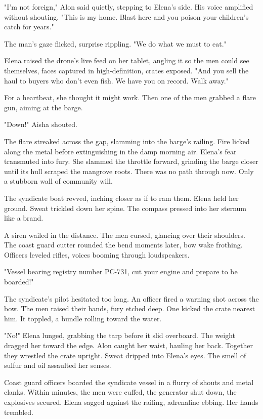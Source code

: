 "I'm not foreign," Alon said quietly, stepping to Elena's side. His voice amplified without shouting. "This is my home. Blast here and you poison your children's catch for years."

The man's gaze flicked, surprise rippling. "We do what we must to eat."

Elena raised the drone's live feed on her tablet, angling it so the men could see themselves, faces captured in high-definition, crates exposed. "And you sell the haul to buyers who don't even fish. We have you on record. Walk away."

For a heartbeat, she thought it might work. Then one of the men grabbed a flare gun, aiming at the barge.

"Down!" Aisha shouted.

The flare streaked across the gap, slamming into the barge's railing. Fire licked along the metal before extinguishing in the damp morning air. Elena's fear transmuted into fury. She slammed the throttle forward, grinding the barge closer until its hull scraped the mangrove roots. There was no path through now. Only a stubborn wall of community will.

The syndicate boat revved, inching closer as if to ram them. Elena held her ground. Sweat trickled down her spine. The compass pressed into her sternum like a brand.

A siren wailed in the distance. The men cursed, glancing over their shoulders. The coast guard cutter rounded the bend moments later, bow wake frothing. Officers leveled rifles, voices booming through loudspeakers.

"Vessel bearing registry number PC-731, cut your engine and prepare to be boarded!"

The syndicate's pilot hesitated too long. An officer fired a warning shot across the bow. The men raised their hands, fury etched deep. One kicked the crate nearest him. It toppled, a bundle rolling toward the water.

"No!" Elena lunged, grabbing the tarp before it slid overboard. The weight dragged her toward the edge. Alon caught her waist, hauling her back. Together they wrestled the crate upright. Sweat dripped into Elena's eyes. The smell of sulfur and oil assaulted her senses.

Coast guard officers boarded the syndicate vessel in a flurry of shouts and metal clanks. Within minutes, the men were cuffed, the generator shut down, the explosives secured. Elena sagged against the railing, adrenaline ebbing. Her hands trembled.

